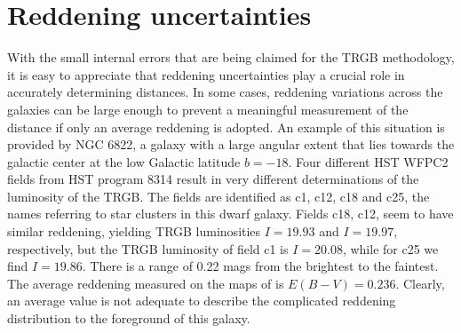 \documentclass[11pt,preprint2]{aastex}
\begin{document}




\section{Reddening uncertainties}
With the small internal errors that are being claimed for the TRGB methodology, it is easy to appreciate that reddening uncertainties play a crucial role in accurately determining distances. In some cases, reddening variations across the galaxies can be large enough to prevent a meaningful measurement of the distance if only an average reddening is adopted. An example of this situation is provided by NGC 6822, a galaxy with a large angular extent that lies towards the galactic center at the low Galactic latitude $b=-18$. Four different HST WFPC2 fields from HST program 8314 result in very different determinations of the luminosity of the TRGB. The fields are identified as c1, c12, c18 and c25, the names referring to star clusters in this dwarf galaxy. Fields c18, c12, seem to have similar reddening, yielding TRGB luminosities  $I=19.93$ and $I=19.97$, respectively, but the TRGB luminosity of field c1 is $I=20.08$, while for c25 we find $I=19.86$. There is a range of 0.22 mags from the brightest to the faintest.   The average reddening measured on the maps of \cite{1998ApJ...500..525S} is $E(B-V)=0.236$. Clearly, an average value is not adequate to describe the complicated reddening distribution to the foreground of this galaxy.  
\end{document}
